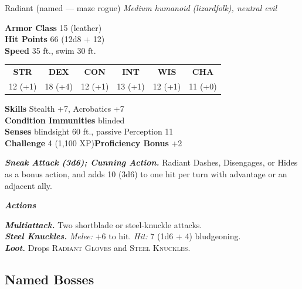 \documentclass[10pt,twoside]{article}
\newcommand{\abilities}[6]{%
\begin{center}\small
\setlength{\tabcolsep}{6pt}\renewcommand{\arraystretch}{1.05}
\begin{tabular}{cccccc}
\textbf{STR}&\textbf{DEX}&\textbf{CON}&\textbf{INT}&\textbf{WIS}&\textbf{CHA}\\[1pt]
#1&#2&#3&#4&#5&#6\\
\end{tabular}\end{center}}
\newcommand{\sbrule}{\par\vspace{2pt}\noindent{\color{bloodred}\rule{\linewidth}{1.1pt}}\par\vspace{2pt}}
\newcommand{\eqname}[1]{\textsc{#1}}
\begin{document}
\begin{statblock}{Radiant \textnormal{(named --- maze rogue)}}
\textit{Medium humanoid (lizardfolk), neutral evil}\sbrule
\textbf{Armor Class} 15 (leather)\\
\textbf{Hit Points} 66 (12d8 + 12)\\
\textbf{Speed} 35 ft., swim 30 ft.\sbrule
\abilities{12 (+1)}{18 (+4)}{12 (+1)}{13 (+1)}{12 (+1)}{11 (+0)}
\sbrule
\textbf{Skills} Stealth +7, Acrobatics +7\\
\textbf{Condition Immunities} blinded\\
\textbf{Senses} blindsight 60 ft., passive Perception 11\\
\textbf{Challenge} 4 (1,100 XP)\hfill\textbf{Proficiency Bonus} +2\sbrule
\textbf{\textit{Sneak Attack (3d6); Cunning Action.}} Radiant Dashes, Disengages, or
Hides as a bonus action, and adds 10 (3d6) to one hit per turn with advantage or an
adjacent ally.\sbrule
\textit{\textbf{Actions}}\par
\textbf{\textit{Multiattack.}} Two shortblade or steel-knuckle attacks.\\
\textbf{\textit{Steel Knuckles.}} \textit{Melee:} +6 to hit. \textit{Hit:} 7 (1d6 + 4)
bludgeoning.\\
\textbf{\textit{Loot.}} Drops \eqname{Radiant Gloves} and \eqname{Steel Knuckles}.
\end{statblock}
\subsection*{Named Bosses}
\end{document}
